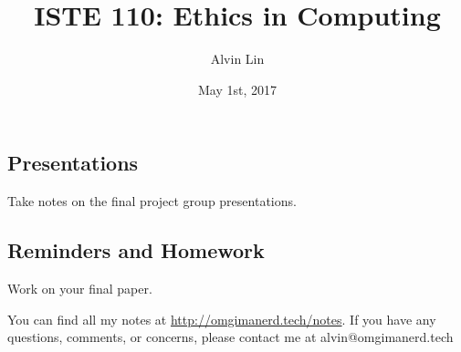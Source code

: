\documentclass[letterpaper, 12pt]{article}
\title{ISTE 110: Ethics in Computing}
\author{Alvin Lin}
\date{May 1st, 2017}
\begin{document}
\maketitle

\subsection*{Presentations}
Take notes on the final project group presentations.

\subsection*{Reminders and Homework}
Work on your final paper.

\begin{center}
  You can find all my notes at \url{http://omgimanerd.tech/notes}. If you have
  any questions, comments, or concerns, please contact me at
  alvin@omgimanerd.tech
\end{center}
\end{document}
